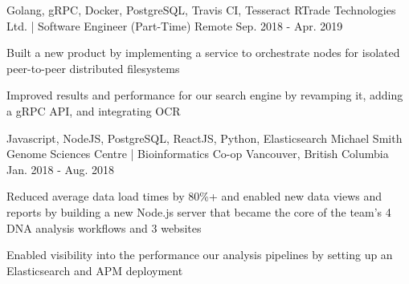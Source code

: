 \begin{cventries}
  \cventry
    {Golang, gRPC, Docker, PostgreSQL, Travis CI, Tesseract} %
    {RTrade Technologies Ltd. | Software Engineer (Part-Time)} %
    {Remote} %
    {Sep. 2018 - Apr. 2019} %
    {
      \begin{cvitems} %
        \item {Built a new product by implementing a service to orchestrate nodes for isolated peer-to-peer distributed filesystems}
        \item {Improved results and performance for our search engine by revamping it, adding a gRPC API, and integrating OCR}
      \end{cvitems}
    }

  \cventry
    {Javascript, NodeJS, PostgreSQL, ReactJS, Python, Elasticsearch} %
    {Michael Smith Genome Sciences Centre | Bioinformatics Co-op} %
    {Vancouver, British Columbia} %
    {Jan. 2018 - Aug. 2018} %
    {
      \begin{cvitems} %
        \item {Reduced average data load times by 80\%+ and enabled new data views and reports by building a new Node.js server that became the core of the team’s 4 DNA analysis workflows and 3 websites}
        \item {Enabled visibility into the performance our analysis pipelines by setting up an Elasticsearch and APM deployment}
      \end{cvitems}
    }

\end{cventries}
